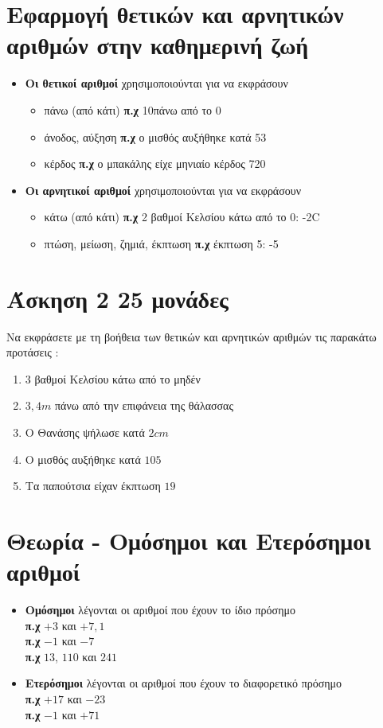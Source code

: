 \documentclass[a4paper,10pt]{report}
\begin{document}
\section*{Εφαρμογή θετικών και αρνητικών αριθμών στην καθημερινή ζωή\hfill \small{}}
\begin{itemize}
 \item  \textbf{Οι θετικοί αριθμοί} χρησιμοποιούνται για να εκφράσουν
        \begin{itemize}
         \item πάνω (από κάτι) \textbf{π.χ} 10\textdegree πάνω από το 0
         \item άνοδος, αύξηση \textbf{π.χ} ο μισθός αυξήθηκε κατά 53\texteuro
         \item κέρδος \textbf{π.χ} ο μπακάλης είχε μηνιαίο κέρδος 720 \texteuro
        \end{itemize}
 \item  \textbf{Οι αρνητικοί αριθμοί} χρησιμοποιούνται για να εκφράσουν
        \begin{itemize}
         \item κάτω (από κάτι) \textbf{π.χ} 2 βαθμοί Κελσίου κάτω από το 0: -2\textdegree C
         \item πτώση, μείωση, ζημιά, έκπτωση \textbf{π.χ} έκπτωση 5\texteuro : -5\texteuro
        \end{itemize}
\end{itemize}

\section*{Άσκηση 2  \hfill \small{25 μονάδες}}
Να εκφράσετε με τη βοήθεια των θετικών και αρνητικών αριθμών τις παρακάτω προτάσεις :
\begin{enumerate}[1)]
\item $3$ βαθμοί Κελσίου κάτω από το μηδέν
\item $3,4m$ πάνω από την επιφάνεια της θάλασσας
\item Ο Θανάσης ψήλωσε κατά $2cm$
\item Ο μισθός αυξήθηκε κατά $105$\texteuro
\item Τα παπούτσια είχαν έκπτωση $19$\texteuro
\end{enumerate}


\section*{Θεωρία - Ομόσημοι και Ετερόσημοι αριθμοί\hfill \small{}}
\begin{itemize}
 \item \textbf{Ομόσημοι} λέγονται οι αριθμοί που έχουν το ίδιο πρόσημο\\
       \textbf{π.χ} $+3$ και $+7,1$\\
       \textbf{π.χ} $-1$ και $-7$\\
       \textbf{π.χ} $13$, $110$ και $241$
 \item \textbf{Ετερόσημοι} λέγονται οι αριθμοί που έχουν το διαφορετικό πρόσημο\\
       \textbf{π.χ} $+17$ και $-23$\\
       \textbf{π.χ} $-1$ και $+71$
\end{itemize}
\end{document}
